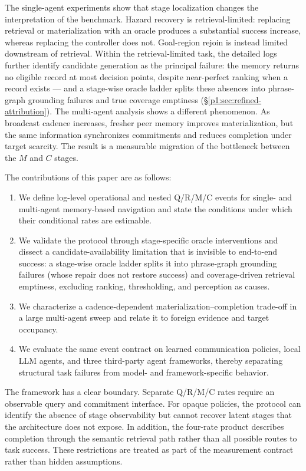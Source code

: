 \documentclass{article}
\begin{document}
The single-agent experiments show that stage localization changes the
interpretation of the benchmark. Hazard recovery is retrieval-limited:
replacing retrieval or materialization with an oracle produces a
substantial success increase, whereas replacing the controller does
not. Goal-region rejoin is instead limited downstream of retrieval.
Within the retrieval-limited task, the detailed logs further identify
candidate generation as the principal failure: the memory returns no
eligible record at most decision points, despite near-perfect ranking
when a record exists --- and a stage-wise oracle ladder splits these
absences into phrase-graph grounding failures and true coverage
emptiness (\S\ref{p1:sec:refined-attribution}). The multi-agent analysis shows a different
phenomenon. As broadcast cadence increases, fresher peer memory
improves materialization, but the same information synchronizes
commitments and reduces completion under target scarcity. The result
is a measurable migration of the bottleneck between the $M$ and $C$
stages.

The contributions of this paper are as follows:
\begin{enumerate}[leftmargin=20pt,itemsep=2pt,topsep=2pt]
\item We define log-level operational and nested Q/R/M/C events for
single- and multi-agent memory-based navigation and state the
conditions under which their conditional rates are estimable.
\item We validate the protocol through stage-specific oracle
interventions and dissect a candidate-availability limitation that is
invisible to end-to-end success: a stage-wise oracle ladder splits it
into phrase-graph grounding failures (whose repair does not restore
success) and coverage-driven retrieval emptiness, excluding ranking,
thresholding, and perception as causes.
\item We characterize a cadence-dependent materialization--completion
trade-off in a large multi-agent sweep and relate it to foreign
evidence and target occupancy.
\item We evaluate the same event contract on learned communication
policies, local LLM agents, and three third-party agent frameworks,
thereby separating structural task failures from model- and
framework-specific behavior.
\end{enumerate}

The framework has a clear boundary. Separate Q/R/M/C rates require an
observable query and commitment interface. For opaque policies, the
protocol can identify the absence of stage observability but cannot
recover latent stages that the architecture does not expose. In
addition, the four-rate product describes completion through the
semantic retrieval path rather than all possible routes to task
success. These restrictions are treated as part of the measurement
contract rather than hidden assumptions.
\end{document}
